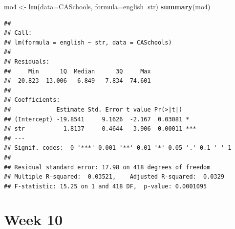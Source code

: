 \documentclass[
]{book}
\newenvironment{Shaded}{\begin{snugshade}}{\end{snugshade}}
\newcommand{\DataTypeTok}[1]{\textcolor[rgb]{0.13,0.29,0.53}{#1}}
\newcommand{\KeywordTok}[1]{\textcolor[rgb]{0.13,0.29,0.53}{\textbf{#1}}}
\newcommand{\NormalTok}[1]{#1}
\newcommand{\OperatorTok}[1]{\textcolor[rgb]{0.81,0.36,0.00}{\textbf{#1}}}
\newcommand{\StringTok}[1]{\textcolor[rgb]{0.31,0.60,0.02}{#1}}
\begin{document}
\begin{Shaded}
\begin{Highlighting}[]
\NormalTok{mo4 <-}\StringTok{ }\KeywordTok{lm}\NormalTok{(}\DataTypeTok{data=}\NormalTok{CASchools, }\DataTypeTok{formula=}\NormalTok{english}\OperatorTok{~}\NormalTok{str)}
\KeywordTok{summary}\NormalTok{(mo4)}
\end{Highlighting}
\end{Shaded}

\begin{verbatim}
## 
## Call:
## lm(formula = english ~ str, data = CASchools)
## 
## Residuals:
##     Min      1Q  Median      3Q     Max 
## -20.823 -13.006  -6.849   7.834  74.601 
## 
## Coefficients:
##             Estimate Std. Error t value Pr(>|t|)    
## (Intercept) -19.8541     9.1626  -2.167  0.03081 *  
## str           1.8137     0.4644   3.906  0.00011 ***
## ---
## Signif. codes:  0 '***' 0.001 '**' 0.01 '*' 0.05 '.' 0.1 ' ' 1
## 
## Residual standard error: 17.98 on 418 degrees of freedom
## Multiple R-squared:  0.03521,    Adjusted R-squared:  0.0329 
## F-statistic: 15.25 on 1 and 418 DF,  p-value: 0.0001095
\end{verbatim}

\hypertarget{week-10}{%
\section{Week 10}\label{week-10}}
\end{document}
